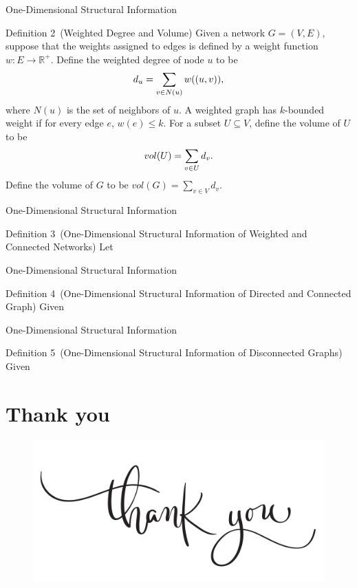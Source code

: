 \documentclass[t,aspectratio=169,usepdftitle=false]{beamer}
\begin{document}
  \begin{frame}{One-Dimensional Structural Information}
    \begin{exampleblock}{Definition 2~(Weighted Degree and Volume)}
      Given a network $G=(V, E)$, suppose that the weights assigned to edges is defined by a weight function $w: E \rightarrow \mathbb{R}^{+}$.
      Define the weighted degree of node $u$ to be 
      \begin{equation}
        d_{u}=\sum_{v \in N(u)} w((u,v)), \notag
      \end{equation}
      where $N(u)$ is the set of neighbors of $u$. 
      A weighted graph has $k$-bounded weight if for every edge $e$, $w(e) \leq k$.
      For a subset $U \subseteq V$, define the volume of $U$ to be
      \begin{equation}
        vol(U) = \sum_{v \in U} d_{v}. \notag
      \end{equation}
      Define the volume of $G$ to be $vol(G) = \sum_{v \in V} d_{v}$.
    \end{exampleblock}
  \end{frame}

  \begin{frame}{One-Dimensional Structural Information}
    \begin{exampleblock}{Definition 3~(One-Dimensional Structural Information of Weighted and Connected Networks)}
      Let
    \end{exampleblock}
  \end{frame}

  \begin{frame}{One-Dimensional Structural Information}
    \begin{exampleblock}{Definition 4~(One-Dimensional Structural Information of Directed and Connected Graph)}
      Given
    \end{exampleblock}
  \end{frame}
  
  \begin{frame}{One-Dimensional Structural Information}
    \begin{exampleblock}{Definition 5~(One-Dimensional Structural Information of Disconnected Graphs)}
      Given
    \end{exampleblock}
  \end{frame}

\section*{Thank you}
  \begin{frame}{}
    \begin{figure}
      \includegraphics[width=1.0\textwidth]{./figures/thank_you.png}
    \end{figure}
  \end{frame}
\end{document}
